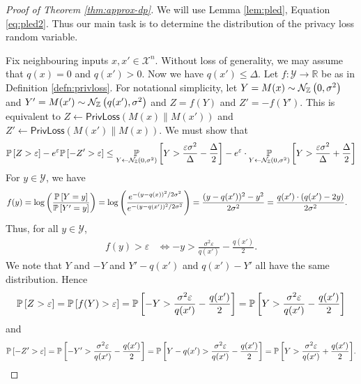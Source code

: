 \documentclass{jpc}
\newcommand{\dgausss}[2]{{\discN\left(#1,#2\right)}}
\newcommand{\dgauss}[1]{\dgausss{0}{#1}}
\newcommand{\pr}[2]{{\ifx&#1& \mathbb{P} \else
\underset{#1}{\mathbb{P}} \fi \left[#2\right]}}
\newcommand{\eps}{\varepsilon}
\newcommand{\privloss}[2]{\mathsf{PrivLoss}\left(#1\middle\|#2\right)}
\newcommand{\R}{\mathbb{R}}
\begin{document}
\begin{proof}[Proof of Theorem \ref{thm:approx-dp}]
We will use Lemma \ref{lem:pled}, Equation \ref{eq:pled2}. Thus
our main task is to determine the distribution of the privacy loss random variable.

Fix neighbouring inputs $x,x'\in\mathcal{X}^n$. Without loss of generality, we may assume that $q(x)=0$ and $q(x')>0$. Now we have $q(x')\le\Delta$.
Let $f : \mathcal{Y} \to \R$ be as in Definition \ref{defn:privloss}.
For notational simplicity, let $Y=M(x)\sim \dgauss{\sigma^2}$ and $Y'=M(x')\sim \dgausss{q(x')}{\sigma^2}$ and $Z=f(Y)$ and $Z'=-f(Y')$. This is equivalent to $Z \gets \privloss{M(x)}{M(x')}$ and $Z' \gets \privloss{M(x')}{M(x)}$.
We must show that $$\pr{}{Z>\eps}-e^\eps \pr{}{-Z'>\eps} \le \pr{Y \gets \dgauss{\sigma^2}}{Y > \frac{\eps \sigma^2}{\Delta} - \frac{\Delta}{2}} - e^\eps \cdot \pr{Y \gets \dgauss{\sigma^2}}{Y > \frac{\eps \sigma^2}{\Delta} + \frac{\Delta}{2}}$$
For $y \in \mathcal{Y}$, we have
\begin{align*}
    f(y) &= \log \left(\frac{\pr{}{Y=y}}{\pr{}{Y'=y}}\right)
    = \log \left(\frac{e^{-(y-q(x))^2/2\sigma^2}}{e^{-(y-q(x'))^2/2\sigma^2}}\right)
    = \frac{(y-q(x'))^2-y^2}{2\sigma^2}
    = \frac{q(x') \cdot (q(x') -2y)}{2\sigma^2}.
\end{align*}
Thus, for all $y \in \mathcal{Y}$,
\begin{align*}
    f(y) > \eps &\iff -y > \frac{\sigma^2\eps}{q(x')}-\frac{q(x')}{2}.
\end{align*}
We note that $Y$ and $-Y$ and $Y'-q(x')$ and $q(x')-Y'$ all have the same distribution. Hence
$$\pr{}{Z>\eps} = \pr{}{f(Y)>\eps} = \pr{}{-Y > \frac{\sigma^2\eps}{q(x')}-\frac{q(x')}{2}} = \pr{}{Y > \frac{\sigma^2\eps}{q(x')}-\frac{q(x')}{2}}$$
and
$$\pr{}{-Z'>\eps} = \pr{}{-Y' > \frac{\sigma^2\eps}{q(x')}-\frac{q(x')}{2}} = \pr{}{Y-q(x') > \frac{\sigma^2\eps}{q(x')}-\frac{q(x')}{2}} = \pr{}{Y > \frac{\sigma^2\eps}{q(x')}+\frac{q(x')}{2}}.$$\qedhere
\end{proof}
\end{document}

